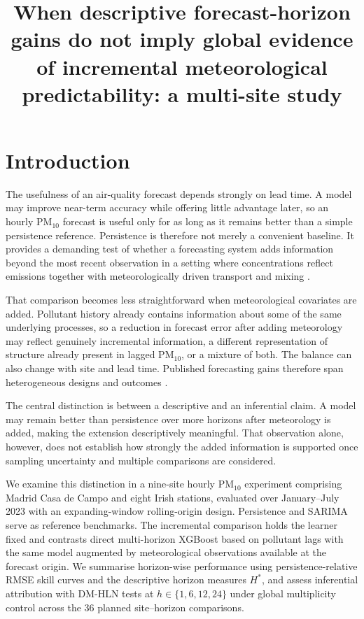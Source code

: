 \documentclass[pdflatex,sn-basic,iicol]{sn-jnl}
\title[Descriptive horizon gains vs global inferential support in \PMten{} forecasting]
{When descriptive forecast-horizon gains do not imply global evidence
of incremental meteorological predictability: a multi-site \PMten{} study}
\author*[1]{\fnm{Federico} \sur{García Crespí}\orcid{https://orcid.org/0000-0002-7129-7791}}\email{fedeg@umh.es}
\affil*[1]{\orgdiv{Departamento de Ingeniería de Computadores},
  \orgname{Universidad Miguel Hernández de Elche},
  \orgaddress{\city{Elche}, \country{Spain}}}
\newcommand{\PMten}{\ensuremath{\mathrm{PM}_{10}}}
\begin{document}
\maketitle
\linenumbers

\section{Introduction}
\label{sec:intro}

The usefulness of an air-quality forecast depends strongly on lead time. A
model may improve near-term accuracy while offering little advantage later,
so an hourly \PMten{} forecast is useful only for as long as it remains better
than a simple persistence reference. Persistence is therefore not merely a
convenient baseline. It provides a demanding test of whether a forecasting
system adds information beyond the most recent observation in a setting where
concentrations reflect emissions together with meteorologically driven
transport and mixing \citep{Seinfeld2006, Kumar2016}.

That comparison becomes less straightforward when meteorological covariates
are added. Pollutant history already contains information about some of the
same underlying processes, so a reduction in forecast error after adding
meteorology may reflect genuinely incremental information, a different
representation of structure already present in lagged \PMten{}, or a mixture
of both. The balance can also change with site and lead time. Published
forecasting gains therefore span heterogeneous designs and outcomes
\citep{Mendez2023, Pak2018, Bai2018, AnsariQuaff2025}.

The central distinction is between a descriptive and an inferential claim. A
model may remain better than persistence over more horizons after meteorology
is added, making the extension descriptively meaningful. That observation
alone, however, does not establish how strongly the added information is
supported once sampling uncertainty and multiple comparisons are considered.

We examine this distinction in a nine-site hourly \PMten{} experiment
comprising Madrid Casa de Campo and eight Irish stations, evaluated over
January--July 2023 with an expanding-window rolling-origin design. Persistence
and SARIMA serve as reference benchmarks. The incremental comparison holds
the learner fixed and contrasts direct multi-horizon XGBoost based on
pollutant lags with the same model augmented by meteorological observations
available at the forecast origin. We summarise horizon-wise performance using
persistence-relative RMSE skill curves and the descriptive horizon measures
$H^*$, and assess inferential attribution with DM-HLN tests
\citep{Diebold1995, Harvey1997} at $h\in\{1,6,12,24\}$ under global
multiplicity control across the 36 planned site--horizon comparisons.
\end{document}
